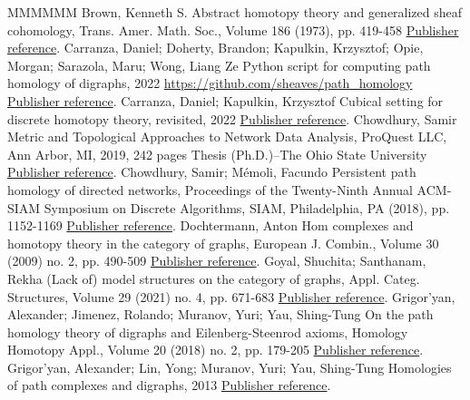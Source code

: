 \documentclass[11pt]{article}
\theoremstyle{definition}
\numberwithin{equation}{section}
\begin{document}
\begin{thebibliography}{MMMMMM}
 Brown, Kenneth S. Abstract homotopy theory and generalized sheaf cohomology, Trans. Amer. Math. Soc., Volume 186 (1973), pp. 419-458 \href{https://alco.centre-mersenne.org/articles/10.5802/alco.341/#brown:abstract-homotopy-theory}{Publisher reference}.
 Carranza, Daniel; Doherty, Brandon; Kapulkin, Krzysztof; Opie, Morgan; Sarazola, Maru; Wong, Liang Ze Python script for computing path homology of digraphs, 2022 \url{https://github.com/sheaves/path_homology} \href{https://alco.centre-mersenne.org/articles/10.5802/alco.341/#python_script}{Publisher reference}.
 Carranza, Daniel; Kapulkin, Krzysztof Cubical setting for discrete homotopy theory, revisited, 2022 \href{https://alco.centre-mersenne.org/articles/10.5802/alco.341/#carranza-kapulkin:cubical-setting}{Publisher reference}.
 Chowdhury, Samir Metric and Topological Approaches to Network Data Analysis, ProQuest LLC, Ann Arbor, MI, 2019, 242 pages Thesis (Ph.D.)–The Ohio State University \href{https://alco.centre-mersenne.org/articles/10.5802/alco.341/#chowdhury}{Publisher reference}.
 Chowdhury, Samir; Mémoli, Facundo Persistent path homology of directed networks, Proceedings of the Twenty-Ninth Annual ACM-SIAM Symposium on Discrete Algorithms, SIAM, Philadelphia, PA (2018), pp. 1152-1169 \href{https://alco.centre-mersenne.org/articles/10.5802/alco.341/#chowdhury-memoli}{Publisher reference}.
 Dochtermann, Anton Hom complexes and homotopy theory in the category of graphs, European J. Combin., Volume 30 (2009) no. 2, pp. 490-509 \href{https://alco.centre-mersenne.org/articles/10.5802/alco.341/#dochtermann}{Publisher reference}.
 Goyal, Shuchita; Santhanam, Rekha (Lack of) model structures on the category of graphs, Appl. Categ. Structures, Volume 29 (2021) no. 4, pp. 671-683 \href{https://alco.centre-mersenne.org/articles/10.5802/alco.341/#goyal-santhanam}{Publisher reference}.
 Grigor’yan, Alexander; Jimenez, Rolando; Muranov, Yuri; Yau, Shing-Tung On the path homology theory of digraphs and Eilenberg-Steenrod axioms, Homology Homotopy Appl., Volume 20 (2018) no. 2, pp. 179-205 \href{https://alco.centre-mersenne.org/articles/10.5802/alco.341/#grigor'yan-jimenez-muranov-yau}{Publisher reference}.
 Grigor’yan, Alexander; Lin, Yong; Muranov, Yuri; Yau, Shing-Tung Homologies of path complexes and digraphs, 2013 \href{https://alco.centre-mersenne.org/articles/10.5802/alco.341/#grigor'yan-lin-muranov-yau:unpublished}{Publisher reference}.

\end{thebibliography}
\end{document}
